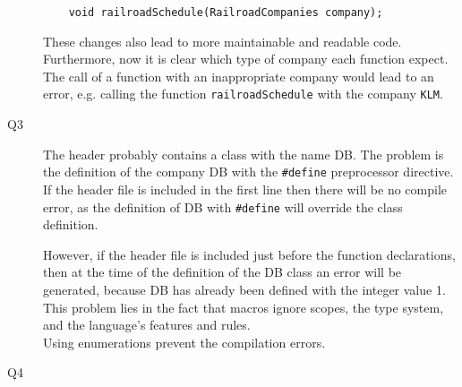 \documentclass[a4paper]{article}
\newcounter{exerciseCount}
\newcommand{\exercise}[1]{\addtocounter{exerciseCount}{1} \noindent \medskip {\large \textsf{\textbf{Exercise \arabic{exerciseCount} #1}}} \par}
\begin{document}
\begin{description}
\begin{verbatim}
	void railroadSchedule(RailroadCompanies company);
	\end{verbatim}
	
	These changes also lead to more maintainable and readable code. Furthermore, now it is clear which type of company each function expect. The call of a function with an inappropriate company would lead to an error, e.g. calling the function \verb|railroadSchedule| with the company \verb|KLM|.
	\item[Q3]\-
	The header probably contains a class with the name DB. The problem is the definition of the company DB with the \verb|#define| preprocessor directive. If the header file is included in the first line then there will be no compile error, as the definition of DB with \verb|#define| will override the class definition.
	
	However, if the header file is included just before the function declarations, then at the time of the definition of the DB class an error will be generated, because DB has already been defined with the integer value 1. This problem lies in the fact that macros ignore scopes, the type system, and the language's features and rules.\\
	
	Using enumerations prevent the compilation errors. 
	\item[Q4]\-
\end{description}

\exercise{}
\end{document}
